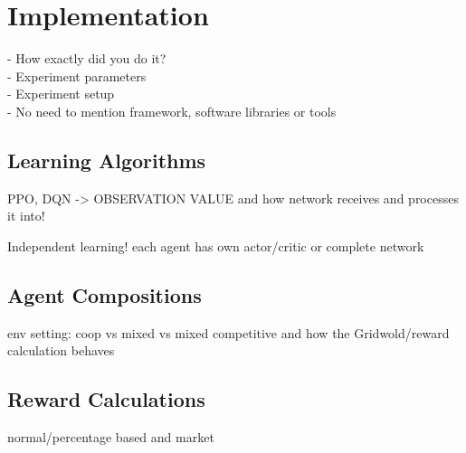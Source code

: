 %
%
\chapter{Implementation}\label{sec:Implementation}
- How exactly did you do it? \\
- Experiment parameters \\
- Experiment setup \\
- No need to mention framework, software libraries or tools

\section{Learning Algorithms}
PPO, DQN -> OBSERVATION VALUE and how network receives and processes it into!

Independent learning! each agent has own actor/critic or complete network

\section{Agent Compositions}
env setting: coop vs mixed vs mixed competitive and how the Gridwold/reward calculation behaves

\section{Reward Calculations}
normal/percentage based and market